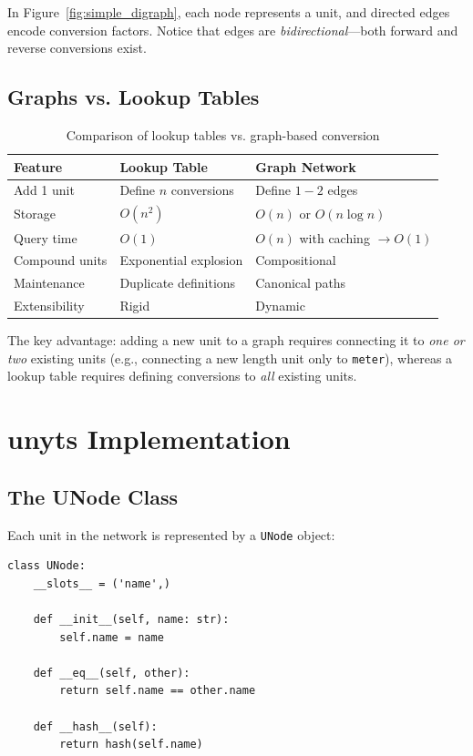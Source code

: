 \documentclass[11pt,a4paper]{report}
\begin{document}
In Figure~\ref{fig:simple_digraph}, each node represents a unit, and directed edges encode conversion factors. Notice that edges are \emph{bidirectional}—both forward and reverse conversions exist.

\subsection{Graphs vs. Lookup Tables}

\begin{table}[h]
\centering
\begin{tabular}{@{}lll@{}}
\toprule
\textbf{Feature} & \textbf{Lookup Table} & \textbf{Graph Network} \\
\midrule
Add 1 unit & Define $n$ conversions & Define $1{-}2$ edges \\
Storage & $O(n^2)$ & $O(n)$ or $O(n \log n)$ \\
Query time & $O(1)$ & $O(n)$ with caching $\rightarrow O(1)$ \\
Compound units & Exponential explosion & Compositional \\
Maintenance & Duplicate definitions & Canonical paths \\
Extensibility & Rigid & Dynamic \\
\bottomrule
\end{tabular}
\caption{Comparison of lookup tables vs. graph-based conversion}
\label{tab:graph_vs_lookup}
\end{table}

The key advantage: adding a new unit to a graph requires connecting it to \emph{one or two} existing units (e.g., connecting a new length unit only to \texttt{meter}), whereas a lookup table requires defining conversions to \emph{all} existing units.

\section{unyts Implementation}

\subsection{The UNode Class}

Each unit in the network is represented by a \texttt{UNode} object:

\begin{lstlisting}[style=pythonstyle, caption={UNode implementation (simplified)}]
class UNode:
    __slots__ = ('name',)
    
    def __init__(self, name: str):
        self.name = name
    
    def __eq__(self, other):
        return self.name == other.name
    
    def __hash__(self):
        return hash(self.name)
\end{lstlisting}
\end{document}

